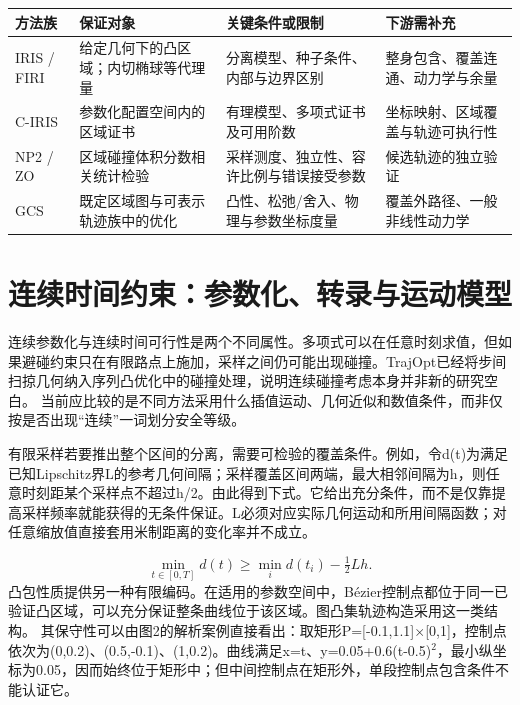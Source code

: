 \documentclass{aas}
\begin{document}
\begin{table}[t]
\centering
{}
\small\setlength{\tabcolsep}{3pt}
\begin{tabular}{>{\raggedright\arraybackslash}p{}>{\raggedright\arraybackslash}p{}>{\raggedright\arraybackslash}p{}>{\raggedright\arraybackslash}p{}}
\toprule
方法族 & 保证对象 & 关键条件或限制 & 下游需补充\\
\midrule
IRIS / FIRI \cite{R10}\cite{R02} & 给定几何下的凸区域；内切椭球等代理量 & 分离模型、种子条件、内部与边界区别 & 整身包含、覆盖连通、动力学与余量\\
C-IRIS \cite{R11} & 参数化配置空间内的区域证书 & 有理模型、多项式证书及可用阶数 & 坐标映射、区域覆盖与轨迹可执行性\\
NP2 / ZO \cite{R15} & 区域碰撞体积分数相关统计检验 & 采样测度、独立性、容许比例与错误接受参数 & 候选轨迹的独立验证\\
GCS \cite{R12}\cite{R21} & 既定区域图与可表示轨迹族中的优化 & 凸性、松弛/舍入、物理与参数坐标度量 & 覆盖外路径、一般非线性动力学\\
\bottomrule
\end{tabular}
\end{table}
\section{连续时间约束：参数化、转录与运动模型}
连续参数化与连续时间可行性是两个不同属性。多项式可以在任意时刻求值，但如果避碰约束只在有限路点上施加，采样之间仍可能出现碰撞。TrajOpt已经将步间扫掠几何纳入序列凸优化中的碰撞处理，说明连续碰撞考虑本身并非新的研究空白。\cite{R08} 当前应比较的是不同方法采用什么插值运动、几何近似和数值条件，而非仅按是否出现“连续”一词划分安全等级。

有限采样若要推出整个区间的分离，需要可检验的覆盖条件。例如，令d(t)为满足已知Lipschitz界L的参考几何间隔；采样覆盖区间两端，最大相邻间隔为h，则任意时刻距某个采样点不超过h/2。由此得到下式。它给出充分条件，而不是仅靠提高采样频率就能获得的无条件保证。L必须对应实际几何运动和所用间隔函数；对任意缩放值直接套用米制距离的变化率并不成立。

\begin{equation}
\min_{t\in[0,T]}d(t)\geq\min_i d(t_i)-\tfrac12 Lh.
\end{equation}
凸包性质提供另一种有限编码。在适用的参数空间中，Bézier控制点都位于同一已验证凸区域，可以充分保证整条曲线位于该区域。图凸集轨迹构造采用这一类结构。\cite{R12} 其保守性可以由图2的解析案例直接看出：取矩形P=[-0.1,1.1]$\times$[0,1]，控制点依次为(0,0.2)、(0.5,-0.1)、(1,0.2)。曲线满足x=t、y=0.05+0.6(t-0.5)$^2$，最小纵坐标为0.05，因而始终位于矩形中；但中间控制点在矩形外，单段控制点包含条件不能认证它。
\end{document}
